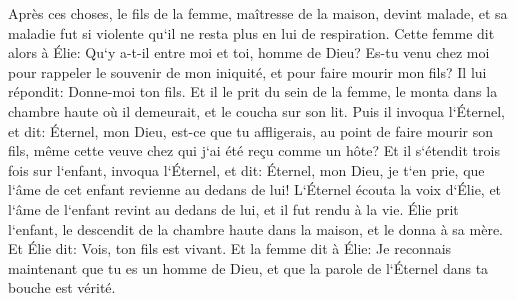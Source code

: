 \verse Après ces choses, le fils de la femme, maîtresse de la maison, devint malade, et sa maladie fut si violente qu`il ne resta plus en lui de respiration. 
\verse Cette femme dit alors à Élie: Qu`y a-t-il entre moi et toi, homme de Dieu? Es-tu venu chez moi pour rappeler le souvenir de mon iniquité, et pour faire mourir mon fils? 
\verse Il lui répondit: Donne-moi ton fils. Et il le prit du sein de la femme, le monta dans la chambre haute où il demeurait, et le coucha sur son lit. 
\verse Puis il invoqua l`Éternel, et dit: Éternel, mon Dieu, est-ce que tu affligerais, au point de faire mourir son fils, même cette veuve chez qui j`ai été reçu comme un hôte? 
\verse Et il s`étendit trois fois sur l`enfant, invoqua l`Éternel, et dit: Éternel, mon Dieu, je t`en prie, que l`âme de cet enfant revienne au dedans de lui! 
\verse L`Éternel écouta la voix d`Élie, et l`âme de l`enfant revint au dedans de lui, et il fut rendu à la vie. 
\verse Élie prit l`enfant, le descendit de la chambre haute dans la maison, et le donna à sa mère. Et Élie dit: Vois, ton fils est vivant. 
\verse Et la femme dit à Élie: Je reconnais maintenant que tu es un homme de Dieu, et que la parole de l`Éternel dans ta bouche est vérité. 

